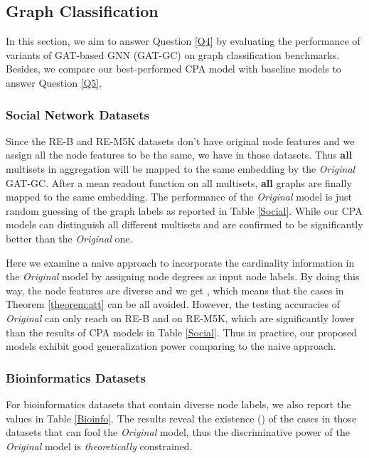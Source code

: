 \documentclass[letterpaper]{article} \usepackage{aaai20}  \usepackage{times}  \usepackage{helvet} \usepackage{courier}  \usepackage[hyphens]{url}  \usepackage{graphicx} \urlstyle{rm} \def\UrlFont{\rm}  \usepackage{graphicx}  \frenchspacing  \setlength{\pdfpagewidth}{8.5in}  \setlength{\pdfpageheight}{11in}
\theoremstyle{plain}
\theoremstyle{definition}
\begin{document}
\subsection{Graph Classification}

In this section, we aim to answer Question \ref{Q4} by evaluating the performance of variants of GAT-based GNN (GAT-GC) on graph classification benchmarks. Besides, we compare our best-performed CPA model with baseline models to answer Question \ref{Q5}.

\subsubsection{Social Network Datasets}
Since the RE-B and RE-M5K datasets don't have original node features and we assign all the node features to be the same, we have  in those datasets. Thus \textbf {all} multisets in aggregation will be mapped to the same embedding by the \textit{Original} GAT-GC. After a mean readout function on all multisets, \textbf {all} graphs are finally mapped to the same embedding. The performance of the \textit{Original} model is just random guessing of the graph labels as reported in Table \ref{Social}. While our CPA models can distinguish all different multisets and are confirmed to be significantly better than the \textit{Original} one. 

Here we examine a naive approach to incorporate the cardinality information in the \textit{Original} model by assigning node degrees as input node labels. By doing this way, the node features are diverse and we get , which means that the cases in Theorem \ref{theorem:att} can be all avoided. However, the testing accuracies of \textit{Original} can only reach  on \textsc{RE-B} and  on \textsc{RE-M5K}, which are significantly lower than the results of CPA models in Table \ref{Social}. Thus in practice, our proposed models exhibit good generalization power comparing to the naive approach.

\subsubsection{Bioinformatics Datasets}
For bioinformatics datasets that contain diverse node labels, we also report the  values in Table \ref{Bioinfo}. The results reveal the existence () of the cases in those datasets that can fool the \textit{Original} model, thus the discriminative power of the \textit{Original} model is {\em theoretically} constrained. 
\end{document}

